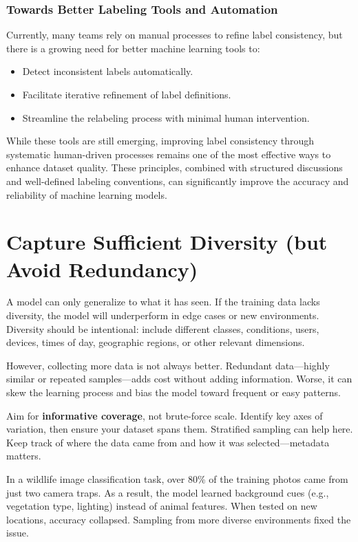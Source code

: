 \documentclass[12pt,openany]{book}
\begin{document}
\subsubsection{Towards Better Labeling Tools and Automation}
Currently, many teams rely on manual processes to refine label consistency, but there is a growing need for better machine learning tools to:
\begin{itemize}
    \item Detect inconsistent labels automatically.
    \item Facilitate iterative refinement of label definitions.
    \item Streamline the relabeling process with minimal human intervention.
\end{itemize}

While these tools are still emerging, improving label consistency through systematic human-driven processes remains one of the most effective ways to enhance dataset quality. These principles, combined with structured discussions and well-defined labeling conventions, can significantly improve the accuracy and reliability of machine learning models.



\section{Capture Sufficient Diversity (but Avoid Redundancy)}

A model can only generalize to what it has seen. If the training data lacks diversity, the model will underperform in edge cases or new environments. Diversity should be intentional: include different classes, conditions, users, devices, times of day, geographic regions, or other relevant dimensions.

However, collecting more data is not always better. Redundant data—highly similar or repeated samples—adds cost without adding information. Worse, it can skew the learning process and bias the model toward frequent or easy patterns.

Aim for \textbf{informative coverage}, not brute-force scale. Identify key axes of variation, then ensure your dataset spans them. Stratified sampling can help here. Keep track of where the data came from and how it was selected—metadata matters.

\begin{examplebox}
In a wildlife image classification task, over 80\% of the training photos came from just two camera traps. As a result, the model learned background cues (e.g., vegetation type, lighting) instead of animal features. When tested on new locations, accuracy collapsed. Sampling from more diverse environments fixed the issue.
\end{examplebox}
\end{document}
